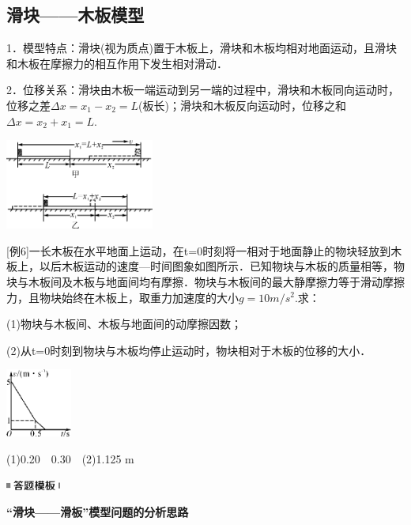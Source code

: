 \documentclass[cn,10.5pt,chinese,mac,chinesefont=founder]{elegantbook}
\begin{document}
\subsection{滑块------木板模型}

1．模型特点：滑块(视为质点)置于木板上，滑块和木板均相对地面运动，且滑块和木板在摩擦力的相互作用下发生相对滑动．

2．位移关系：滑块由木板一端运动到另一端的过程中，滑块和木板同向运动时，位移之差$\Delta x=x_1-x_2=L$(板长)；滑块和木板反向运动时，位移之和$\Delta x=x_2+x_1=L$.

\begin{center}\includegraphics[width=1.92708in,height=1.16667in]{media/image131.png}\end{center}

{[}例6{]}一长木板在水平地面上运动，在t=0时刻将一相对于地面静止的物块轻放到木板上，以后木板运动的速度---时间图象如图所示．已知物块与木板的质量相等，物块与木板间及木板与地面间均有摩擦．物块与木板间的最大静摩擦力等于滑动摩擦力，且物块始终在木板上，取重力加速度的大小$g=10m/s^2$.求：

(1)物块与木板间、木板与地面间的动摩擦因数；

(2)从t=0时刻到物块与木板均停止运动时，物块相对于木板的位移的大小．

\begin{center}\includegraphics[width=0.85417in,height=0.88542in]{media/image132.png}\end{center}
\begin{solution}
	(1)0.20　0.30　(2)1.125 m
\end{solution}
\begin{center}\includegraphics[width=0.70833in,height=0.125in]{media/image25.png}

\textbf{``滑块------滑板''模型问题的分析思路}
\end{center}
\end{document}
